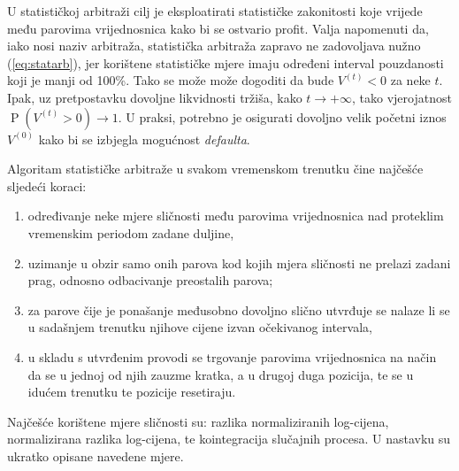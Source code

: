 \documentclass[lmodern, utf8, diplomski, numeric]{fer}
\newcommand{\prob}[1]{\operatorname{P}\left(#1\right)}
\begin{document}
  U statističkoj arbitraži cilj je eksploatirati statističke zakonitosti koje vrijede među parovima vrijednosnica kako bi se ostvario profit.  
  Valja napomenuti da, iako nosi naziv arbitraža, statistička arbitraža zapravo ne zadovoljava nužno (\ref{eq:statarb}), jer korištene statističke mjere imaju određeni interval pouzdanosti koji je manji od 100\%.
  Tako se može može dogoditi da bude $V^{\left(t\right)} < 0$ za neke $t$.
  Ipak, uz pretpostavku dovoljne likvidnosti tržiša, kako $t \to +\infty$, tako vjerojatnost $\prob{V^{\left(t\right)} > 0} \to 1$.
  U praksi, potrebno je osigurati dovoljno velik početni iznos $V^{(0)}$ kako bi se izbjegla mogućnost \textit{defaulta}.
  
  Algoritam statističke arbitraže u svakom vremenskom trenutku čine najčešće sljedeći koraci:
  \begin{enumerate}
    \item određivanje neke mjere sličnosti među parovima vrijednosnica nad proteklim vremenskim periodom zadane duljine,
    \item uzimanje u obzir samo onih parova kod kojih mjera sličnosti ne prelazi zadani prag, odnosno odbacivanje preostalih parova;
    \item za parove čije je ponašanje međusobno dovoljno slično utvrđuje se nalaze li se u sadašnjem trenutku njihove cijene izvan očekivanog intervala,
    \item u skladu s utvrđenim provodi se trgovanje parovima vrijednosnica na način da se u jednoj od njih zauzme kratka, a u drugoj duga pozicija, te se u idućem trenutku te pozicije resetiraju.
  \end{enumerate}
  
  Najčešće korištene mjere sličnosti su: razlika normaliziranih log-cijena, normalizirana razlika log-cijena, te kointegracija slučajnih procesa.
  U nastavku su ukratko opisane navedene mjere.
  
\end{document}
